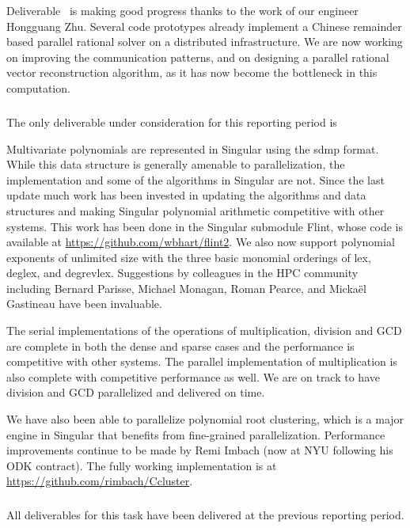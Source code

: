 Deliverable~ is making good progress
  thanks to the work of our \ODK engineer Hongguang Zhu. Several code prototypes
  already implement a Chinese remainder based parallel rational solver on a distributed
  infrastructure. We are now working on improving the communication patterns,
  and on designing a parallel rational vector reconstruction algorithm, as it
  has now become the bottleneck in this computation.
  
  \subparagraph{}

  The only deliverable under consideration for this reporting period
  is~

Multivariate polynomials are represented in Singular using the sdmp format. While this data structure is generally amenable to parallelization, the implementation and some of the algorithms in Singular are not. Since the last update much work has been invested in updating the algorithms and data structures and making Singular polynomial arithmetic competitive with other systems. This work has been done in the Singular submodule Flint, whose code is available at \url{https://github.com/wbhart/flint2}. We also now support polynomial exponents of unlimited size with the three basic monomial orderings of lex, deglex, and degrevlex. Suggestions by colleagues in the HPC community including Bernard Parisse, Michael Monagan, Roman Pearce, and Micka\"el Gastineau have been invaluable.

The serial implementations of the operations of multiplication, division and GCD are complete in both the dense and sparse cases and the performance is competitive with other systems. The parallel implementation of multiplication is also complete with competitive performance as well. We are on track to have division and GCD parallelized and delivered on time.

We have also been able to parallelize polynomial root clustering, which is a
major engine in Singular that benefits from fine-grained
parallelization. Performance improvements continue to be made by Remi Imbach
(now at NYU following his ODK contract). The fully working implementation is
at \url{https://github.com/rimbach/Ccluster}.




  \subparagraph{}

  All deliverables for this task have been delivered at the previous
  reporting period.
  
